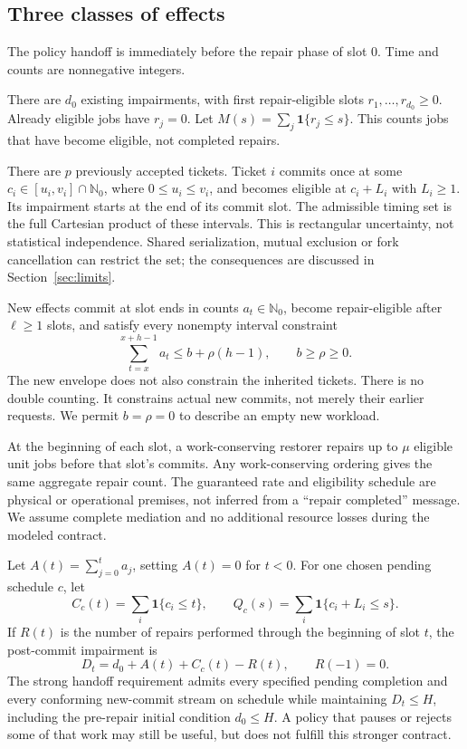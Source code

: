 \documentclass[11pt,a4paper]{article}
\theoremstyle{definition}\newtheorem{definition}{Definition}
\newcommand{\N}{\mathbb N_0}\newcommand{\ind}{\mathbf 1}
\begin{document}
\subsection{Three classes of effects}
The policy handoff is immediately before the repair phase of slot 0. Time and counts are nonnegative integers.
\begin{description}[leftmargin=0.6cm,style=nextline]
\item[Committed inherited effects.] There are $d_0$ existing impairments, with first repair-eligible slots $r_1,\ldots,r_{d_0}\ge0$. Already eligible jobs have $r_j=0$. Let $M(s)=\sum_j\ind\{r_j\le s\}$. This counts jobs that have become eligible, not completed repairs.
\item[In-flight inherited effects.] There are $p$ previously accepted tickets. Ticket $i$ commits once at some $c_i\in[u_i,v_i]\cap\N$, where $0\le u_i\le v_i$, and becomes eligible at $c_i+L_i$ with $L_i\ge1$. Its impairment starts at the end of its commit slot. The admissible timing set is the full Cartesian product of these intervals. This is rectangular uncertainty, not statistical independence. Shared serialization, mutual exclusion or fork cancellation can restrict the set; the consequences are discussed in Section~\ref{sec:limits}.
\item[Ongoing new effects.] New effects commit at slot ends in counts $a_t\in\N$, become repair-eligible after $\ell\ge1$ slots, and satisfy every nonempty interval constraint
\begin{equation}
\sum_{t=x}^{x+h-1}a_t\le b+\rho(h-1),\qquad b\ge\rho\ge0.
\label{eq:arrival}
\end{equation}
The new envelope does not also constrain the inherited tickets. There is no double counting. It constrains actual new commits, not merely their earlier requests. We permit $b=\rho=0$ to describe an empty new workload.
\end{description}
At the beginning of each slot, a work-conserving restorer repairs up to $\mu$ eligible unit jobs before that slot's commits. Any work-conserving ordering gives the same aggregate repair count. The guaranteed rate and eligibility schedule are physical or operational premises, not inferred from a ``repair completed'' message. We assume complete mediation and no additional resource losses during the modeled contract.

Let $A(t)=\sum_{j=0}^t a_j$, setting $A(t)=0$ for $t<0$. For one chosen pending schedule $c$, let
\begin{equation}
C_c(t)=\sum_i\ind\{c_i\le t\},\qquad Q_c(s)=\sum_i\ind\{c_i+L_i\le s\}.
\end{equation}
If $R(t)$ is the number of repairs performed through the beginning of slot $t$, the post-commit impairment is
\begin{equation}
D_t=d_0+A(t)+C_c(t)-R(t),\qquad R(-1)=0.
\end{equation}
The strong handoff requirement admits every specified pending completion and every conforming new-commit stream on schedule while maintaining $D_t\le H$, including the pre-repair initial condition $d_0\le H$. A policy that pauses or rejects some of that work may still be useful, but does not fulfill this stronger contract.
\end{document}
